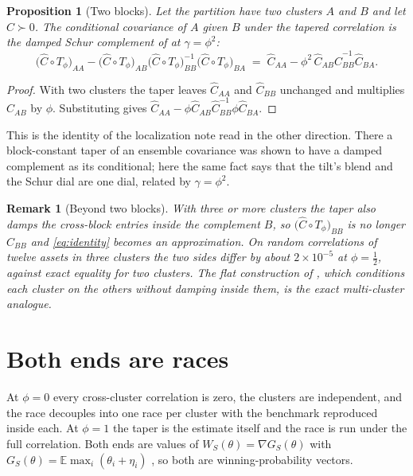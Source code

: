 \documentclass[11pt]{article}
\newcommand{\E}{\mathbb{E}}
\newtheorem{proposition}{Proposition}
\newtheorem{remark}{Remark}
\begin{document}
\begin{proposition}[Two blocks]
\label{prop:two}
Let the partition have two clusters $A$ and $B$ and let $\widehat C\succ0$. The
conditional covariance of $A$ given $B$ under the tapered correlation is the
damped Schur complement of \cite{cotton2024schur} at $\gamma=\phi^2$:
\begin{equation}
  \big(\widehat C\circ T_\phi\big)_{AA}
  -\big(\widehat C\circ T_\phi\big)_{AB}
   \big(\widehat C\circ T_\phi\big)_{BB}^{-1}
   \big(\widehat C\circ T_\phi\big)_{BA}
  \;=\;\widehat C_{AA}-\phi^2\,\widehat C_{AB}\widehat C_{BB}^{-1}\widehat C_{BA}.
  \label{eq:identity}
\end{equation}
\end{proposition}

\begin{proof}
With two clusters the taper leaves $\widehat C_{AA}$ and $\widehat C_{BB}$
unchanged and multiplies $\widehat C_{AB}$ by $\phi$. Substituting gives
$\widehat C_{AA}-\phi\widehat C_{AB}\widehat C_{BB}^{-1}\phi\widehat C_{BA}$.
\end{proof}

This is the identity of the localization note \cite{cotton2026loc} read in the
other direction. There a block-constant taper of an ensemble covariance was
shown to have a damped complement as its conditional; here the same fact says
that the tilt's blend and the Schur dial are one dial, related by
$\gamma=\phi^2$.

\begin{remark}[Beyond two blocks]
With three or more clusters the taper also damps the cross-block entries
\emph{inside} the complement $B$, so $\big(\widehat C\circ T_\phi\big)_{BB}$ is
no longer $\widehat C_{BB}$ and \eqref{eq:identity} becomes an approximation.
On random correlations of twelve assets in three clusters the two sides differ
by about $2\times10^{-5}$ at $\phi=\tfrac12$, against exact equality for two
clusters. The
flat construction of \cite{cotton2026nco}, which conditions each cluster on the
others without damping inside them, is the exact multi-cluster analogue.
\end{remark}

\section{Both ends are races}

At $\phi=0$ every cross-cluster correlation is zero, the clusters are
independent, and the race decouples into one race per cluster with the
benchmark reproduced inside each. At $\phi=1$ the taper is the estimate itself
and the race is run under the full correlation. Both ends are values of
$W_{S}(\theta)=\nabla G_S(\theta)$ with $G_S(\theta)=\E\max_i(\theta_i+\eta_i)$
\cite{cotton2026thurstone}, so both are winning-probability vectors.
\end{document}
